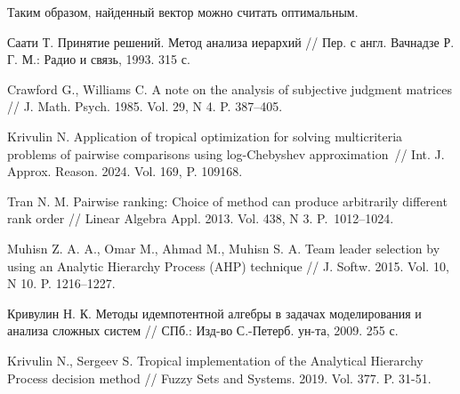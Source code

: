 \documentclass{math-mech-sci}
\begin{document}
Таким образом, найденный вектор можно считать оптимальным.

\begin{thebibliography}{8}

 Саати Т. Принятие решений. Метод анализа иерархий //   Пер. с англ. Вачнадзе Р. Г. М.: Радио и связь, 1993. 315 с.

  Crawford G., Williams C. A note on the analysis of subjective judgment
matrices // J. Math. Psych. 1985. Vol. 29, N 4. P. 387–405.

 Krivulin N. Application of tropical optimization for solving multicriteria problems of pairwise comparisons using log-Chebyshev approximation~// Int. J. Approx. Reason. 2024. Vol. 169, P. 109168. 

 Tran N. M. Pairwise ranking: Choice of method can produce arbitrarily
different rank order // Linear Algebra Appl. 2013. Vol. 438, N 3. P.~1012–1024.

 Muhisn Z. A. A., Omar M., Ahmad M., Muhisn S. A. Team leader selection by using an
Analytic Hierarchy Process (AHP) technique // J. Softw. 2015. Vol. 10, N 10.
P. 1216–1227. 

 Кривулин Н. К. Методы идемпотентной алгебры в задачах моделирования и анализа сложных систем // СПб.: Изд-во С.-Петерб. ун-та, 2009. 255 с.

Krivulin N., Sergeev S. Tropical implementation of the Analytical
Hierarchy Process decision method // Fuzzy Sets and Systems. 2019.
Vol. 377. P. 31-51. 



\end{thebibliography}
\end{document}
